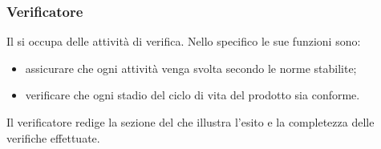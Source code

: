 		\subsubsection{Verificatore}
			Il  si occupa delle attività di verifica. Nello specifico le sue funzioni sono:
			\begin{itemize}
				\item assicurare che ogni attività venga svolta secondo le norme stabilite;
				\item verificare che ogni stadio del ciclo di vita del prodotto sia conforme.
			\end{itemize}
			Il verificatore redige la sezione del  che illustra l’esito e la completezza delle verifiche effettuate.
